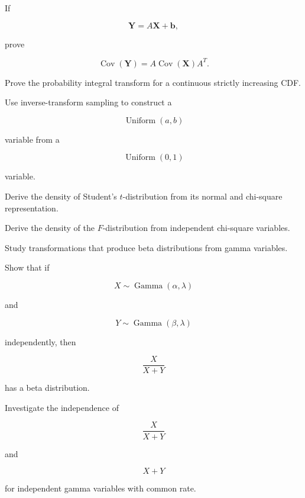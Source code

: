 \begin{exercise}[3]
If

\[
\mathbf{Y}
=
A\mathbf{X}+\mathbf{b},
\]

prove

\[
\operatorname{Cov}(\mathbf{Y})
=
A\operatorname{Cov}(\mathbf{X})A^T.
\]
\end{exercise}

\begin{exercise}[3]
Prove the probability integral transform for a continuous strictly
increasing CDF.
\end{exercise}

\begin{exercise}[3]
Use inverse-transform sampling to construct a

\[
\operatorname{Uniform}(a,b)
\]

variable from a

\[
\operatorname{Uniform}(0,1)
\]

variable.
\end{exercise}

\begin{exercise}[4]
Derive the density of Student's \(t\)-distribution from its normal and
chi-square representation.
\end{exercise}

\begin{exercise}[4]
Derive the density of the \(F\)-distribution from independent
chi-square variables.
\end{exercise}

\begin{exercise}[4]
Study transformations that produce beta distributions from gamma
variables.
\end{exercise}

\begin{exercise}[4]
Show that if

\[
X\sim\operatorname{Gamma}(\alpha,\lambda)
\]

and

\[
Y\sim\operatorname{Gamma}(\beta,\lambda)
\]

independently, then

\[
\frac{X}{X+Y}
\]

has a beta distribution.
\end{exercise}

\begin{exercise}[4]
Investigate the independence of

\[
\frac{X}{X+Y}
\]

and

\[
X+Y
\]

for independent gamma variables with common rate.
\end{exercise}

